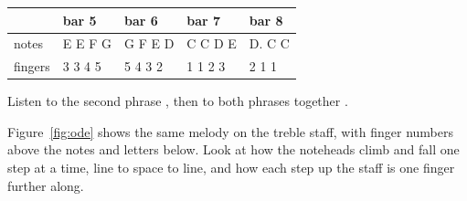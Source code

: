 \begin{center}
\begin{tabular}{lllll}
\toprule
 & bar 5 & bar 6 & bar 7 & bar 8 \\
\midrule
notes & E E F G & G F E D & C C D E & D. C C \\
fingers & 3 3 4 5 & 5 4 3 2 & 1 1 2 3 & 2 1 1 \\
\bottomrule
\end{tabular}
\end{center}

Listen to the second phrase , then to both phrases together .

Figure~\ref{fig:ode} shows the same melody on the treble staff, with finger numbers above the notes and letters below. Look at how the noteheads climb and fall one step at a time, line to space to line, and how each step up the staff is one finger further along.


